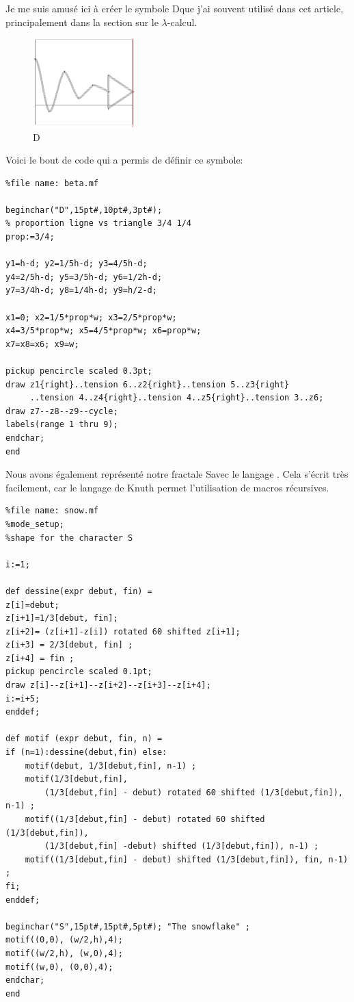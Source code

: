 \documentclass[11pt]{book}
\newcommand{\imp}{{\letterimp D}\hspace{0.1cm}}
\newcommand{\snow}{{\lettersnow S\hspace{0.2cm}}}
\begin{document}
Je me suis  amusé ici à créer le symbole  \imp que j'ai souvent
utilisé dans cet article, principalement dans la section sur le $\lambda$-calcul. 

\begin{figure}[H]
	\centering
	\caption{\imp}
	\includegraphics[width=4.0cm]{imp.png}
\end{figure}
Voici le bout de code qui a permis de définir ce symbole:
\begin{Verbatim}
%file name: beta.mf

beginchar("D",15pt#,10pt#,3pt#);
% proportion ligne vs triangle 3/4 1/4
prop:=3/4;

y1=h-d; y2=1/5h-d; y3=4/5h-d; 
y4=2/5h-d; y5=3/5h-d; y6=1/2h-d;  
y7=3/4h-d; y8=1/4h-d; y9=h/2-d;

x1=0; x2=1/5*prop*w; x3=2/5*prop*w;
x4=3/5*prop*w; x5=4/5*prop*w; x6=prop*w;
x7=x8=x6; x9=w;

pickup pencircle scaled 0.3pt;
draw z1{right}..tension 6..z2{right}..tension 5..z3{right}
     ..tension 4..z4{right}..tension 4..z5{right}..tension 3..z6;
draw z7--z8--z9--cycle; 
labels(range 1 thru 9);
endchar;
end
\end{Verbatim}

Nous avons également représenté notre fractale \snow avec le langage \MF .
Cela s'écrit très facilement, car le langage de Knuth permet l'utilisation
de macros récursives.

\begin{Verbatim}
%file name: snow.mf
%mode_setup;
%shape for the character S

i:=1;

def dessine(expr debut, fin) =
z[i]=debut;
z[i+1]=1/3[debut, fin];
z[i+2]= (z[i+1]-z[i]) rotated 60 shifted z[i+1];
z[i+3] = 2/3[debut, fin] ;
z[i+4] = fin ;  
pickup pencircle scaled 0.1pt;
draw z[i]--z[i+1]--z[i+2]--z[i+3]--z[i+4];
i:=i+5;
enddef;

def motif (expr debut, fin, n) =
if (n=1):dessine(debut,fin) else: 
	motif(debut, 1/3[debut,fin], n-1) ;
	motif(1/3[debut,fin],
		(1/3[debut,fin] - debut) rotated 60 shifted (1/3[debut,fin]), n-1) ;
	motif((1/3[debut,fin] - debut) rotated 60 shifted (1/3[debut,fin]),
		(1/3[debut,fin] -debut) shifted (1/3[debut,fin]), n-1) ;
	motif((1/3[debut,fin] - debut) shifted (1/3[debut,fin]), fin, n-1) ;
fi;
enddef;

beginchar("S",15pt#,15pt#,5pt#); "The snowflake" ;
motif((0,0), (w/2,h),4);
motif((w/2,h), (w,0),4);
motif((w,0), (0,0),4);
endchar;
end
\end{Verbatim}
\end{document}
